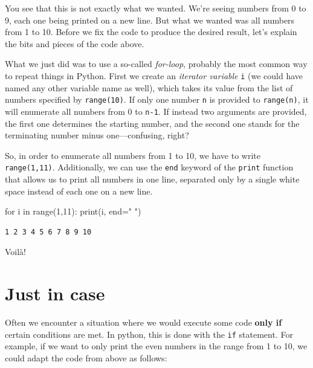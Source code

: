\documentclass[
  a4paperpaper,
  ,captions=tableheading
]{scrbook}
\newenvironment{Shaded}{\begin{snugshade}}{\end{snugshade}}
\newcommand{\BuiltInTok}[1]{\textcolor[rgb]{0.00,0.23,0.31}{#1}}
\newcommand{\ControlFlowTok}[1]{\textcolor[rgb]{0.00,0.23,0.31}{#1}}
\newcommand{\DecValTok}[1]{\textcolor[rgb]{0.68,0.00,0.00}{#1}}
\newcommand{\KeywordTok}[1]{\textcolor[rgb]{0.00,0.23,0.31}{#1}}
\newcommand{\NormalTok}[1]{\textcolor[rgb]{0.00,0.23,0.31}{#1}}
\newcommand{\OperatorTok}[1]{\textcolor[rgb]{0.37,0.37,0.37}{#1}}
\newcommand{\StringTok}[1]{\textcolor[rgb]{0.13,0.47,0.30}{#1}}
\begin{document}
You see that this is not exactly what we wanted. We're seeing numbers
from 0 to 9, each one being printed on a new line. But what we wanted
was all numbers from 1 to 10. Before we fix the code to produce the
desired result, let's explain the bits and pieces of the code above.

What we just did was to use a so-called \emph{for-loop}, probably the
most common way to repeat things in Python. First we create an
\emph{iterator variable} \texttt{i} (we could have named any other
variable name as well), which takes its value from the list of numbers
specified by \texttt{range(10)}. If only one number \texttt{n} is
provided to \texttt{range(n)}, it will enumerate all numbers from 0 to
\texttt{n-1}. If instead two arguments are provided, the first one
determines the starting number, and the second one stands for the
terminating number minus one---confusing, right?

So, in order to enumerate all numbers from 1 to 10, we have to write
\texttt{range(1,11)}. Additionally, we can use the \texttt{end} keyword
of the \texttt{print} function that allows us to print all numbers in
one line, separated only by a single white space instead of each one on
a new line.

\begin{Shaded}
\begin{Highlighting}[]
\ControlFlowTok{for}\NormalTok{ i }\KeywordTok{in} \BuiltInTok{range}\NormalTok{(}\DecValTok{1}\NormalTok{,}\DecValTok{11}\NormalTok{):}
    \BuiltInTok{print}\NormalTok{(i, end}\OperatorTok{=}\StringTok{" "}\NormalTok{)}
\end{Highlighting}
\end{Shaded}

\begin{verbatim}
1 2 3 4 5 6 7 8 9 10 
\end{verbatim}

Voilà!

\hypertarget{just-in-case}{%
\section{Just in case}\label{just-in-case}}

Often we encounter a situation where we would execute some code
\textbf{only if} certain conditions are met. In python, this is done
with the \texttt{if} statement. For example, if we want to only print
the even numbers in the range from 1 to 10, we could adapt the code from
above as follows:
\end{document}
